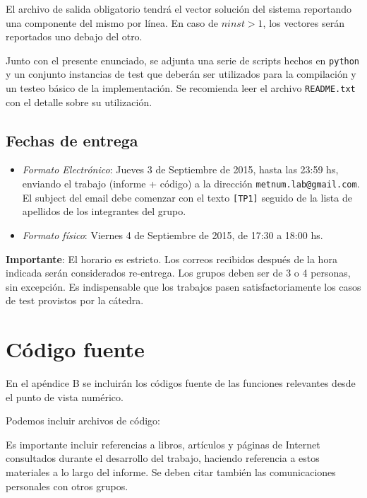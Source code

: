 \documentclass[11pt, a4paper, spanish]{article}
\let\strong\textbf
\theoremstyle{plain}
\theoremstyle{remark}
\begin{document}
\begin{appendices}
      El archivo de salida obligatorio tendrá el vector solución del sistema reportando una componente del mismo por línea. En caso de $ninst > 1$, los vectores serán reportados uno debajo del otro.

      Junto con el presente enunciado, se adjunta una serie de scripts hechos en \texttt{python} y un conjunto instancias de test que deberán ser utilizados para la compilación y un testeo básico de la implementación. Se recomienda leer el archivo \texttt{README.txt} con el detalle sobre su utilización.

    \subsection{Fechas de entrega}
      \begin{itemize}
        \item \emph{Formato Electrónico}: Jueves 3 de Septiembre de 2015, hasta las 23:59 hs, enviando el trabajo (informe + código) a la dirección \texttt{metnum.lab@gmail.com}. El subject del email debe comenzar con el texto \texttt{[TP1]} seguido de la lista de apellidos de los integrantes del grupo.
        \item \emph{Formato físico}: Viernes 4 de Septiembre de 2015, de 17:30 a 18:00 hs.
      \end{itemize}

      \strong{Importante}: El horario es estricto. Los correos recibidos después de la hora indicada serán considerados re-entrega. Los grupos deben ser de 3 o 4 personas, sin excepción. Es indispensable que los trabajos pasen satisfactoriamente los casos de test provistos por la cátedra.

  \newpage
  \section{Código fuente}

    {\color{Gray} En el apéndice B se incluirán los códigos fuente de las funciones relevantes desde el punto de vista numérico.

    Podemos incluir archivos de código:
    }

\end{appendices}

\newpage

\printbibliography[heading=bibintoc]

  {\color{Gray} Es importante incluir referencias a libros, artículos y páginas de Internet consultados durante el desarrollo del trabajo, haciendo referencia a estos materiales a lo largo del informe.
  Se deben citar también las comunicaciones personales con otros grupos.}
\end{document}
